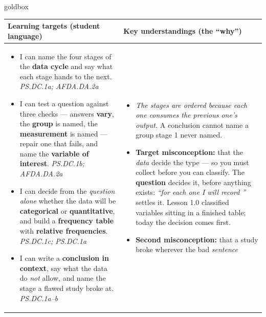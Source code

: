 \documentclass[10pt]{article}
\begin{document}
\renewcommand{\arraystretch}{1.4}
\boxguard
\begin{skillbox}{goldbox}
\begin{tabularx}{\linewidth}{@{}X|X@{}}
\textbf{Learning targets (student language)} & \textbf{Key understandings (the ``why'')} \\[2pt]
\hline
\vspace{-6pt}
\begin{itemize}[leftmargin=1.1em, nosep, after=\vspace{2pt}]
  \item I can name the four stages of the \textbf{data cycle} and say what each stage hands
        to the next. \hfill \textit{PS.DC.1a; AFDA.DA.2a}
  \item I can test a question against three checks --- answers \textbf{vary}, the
        \textbf{group} is named, the \textbf{measurement} is named --- repair one that fails,
        and name the \textbf{variable of interest}. \hfill \textit{PS.DC.1b; AFDA.DA.2a}
  \item I can decide from the \emph{question alone} whether the data will be
        \textbf{categorical} or \textbf{quantitative}, and build a \textbf{frequency table}
        with \textbf{relative frequencies}. \hfill \textit{PS.DC.1c; PS.DC.1a}
  \item I can write a \textbf{conclusion in context}, say what the data do \emph{not} allow,
        and name the stage a flawed study broke at. \hfill \textit{PS.DC.1a--b}
\end{itemize}
&
\vspace{-6pt}
\begin{itemize}[leftmargin=1.1em, nosep, after=\vspace{2pt}]
  \item \emph{The stages are ordered because each one consumes the previous one's output.} A
        conclusion cannot name a group stage 1 never named.
  \item \textbf{Target misconception:} that the \emph{data} decide the type --- so you must
        collect before you can classify. The \textbf{question} decides it, before anything
        exists: \emph{``for each one I will record \underline{\hspace{1.2cm}}''} settles it.
        Lesson 1.0 classified variables sitting in a finished table; today the decision comes
        first.
  \item \textbf{Second misconception:} that a study broke wherever the bad \emph{sentence}

\end{itemize}
\end{tabularx}
\end{skillbox}
\end{document}
